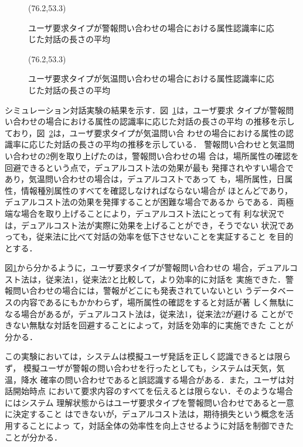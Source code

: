 \begin{figure}[t]
{
\begin{center}
\atari(76.2,53.3)
\end{center}
\caption{ユーザ要求タイプが警報問い合わせの場合における属性認識率に応
じた対話の長さの平均}
\label{p-a-1-graph} }
\end{figure}

\begin{figure}[t]
{
\begin{center}
\atari(76.2,53.3)
\end{center}
\caption{ユーザ要求タイプが気温問い合わせの場合における属性認識率に応
じた対話の長さの平均}
\label{p-a-3-graph} }
\end{figure}

シミュレーション対話実験の結果を示す．図~\ref{p-a-1-graph}は，ユーザ要求
タイプが警報問い合わせの場合における属性の認識率に応じた対話の長さの平均
の推移を示しており，図~\ref{p-a-3-graph}は，ユーザ要求タイプが気温問い合
わせの場合における属性の認識率に応じた対話の長さの平均の推移を示している．
警報問い合わせと気温問い合わせの2例を取り上げたのは，警報問い合わせの場
合は，場所属性の確認を回避できるという点で，デュアルコスト法の効果が最も
発揮されやすい場合であり，気温問い合わせの場合は，デュアルコストであって
も，場所属性，日属性，情報種別属性のすべてを確認しなければならない場合が
ほとんどであり，デュアルコスト法の効果を発揮することが困難な場合であるか
らである．両極端な場合を取り上げることにより，デュアルコスト法にとって有
利な状況では，デュアルコスト法が実際に効果を上げることができ，そうでない
状況であっても，従来法に比べて対話の効率を低下させないことを実証すること
を目的とする．

図\ref{p-a-1-graph}から分かるように，ユーザ要求タイプが警報問い合わせの
場合，デュアルコスト法は，従来法1，従来法2と比較して，より効率的に対話を
実施できた．警報問い合わせの場合には，警報がどこにも発表されていないとい
うデータベースの内容であるにもかかわらず，場所属性の確認をすると対話が著
しく無駄になる場合があるが，デュアルコスト法は，従来法1，従来法2が避ける
ことができない無駄な対話を回避することによって，対話を効率的に実施できた
ことが分かる．

この実験においては，システムは模擬ユーザ発話を正しく認識できるとは限らず，
模擬ユーザが警報の問い合わせを行ったとしても，システムは天気，気温，降水
確率の問い合わせであると誤認識する場合がある．また，ユーザは対話開始時点
において要求内容のすべてを伝えるとは限らない．そのような場合にはシステム
理解状態からはユーザ要求タイプを警報問い合わせであると一意に決定すること
はできないが，デュアルコスト法は，期待損失という概念を活用することによっ
て，対話全体の効率性を向上させるように対話を制御できたことが分かる．

